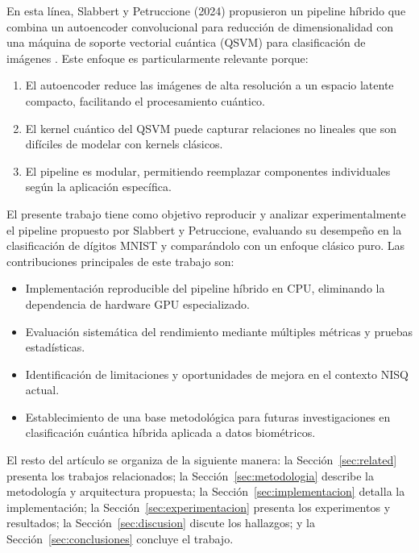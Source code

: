 \documentclass[conference]{IEEEtran}
\begin{document}
En esta línea, Slabbert y Petruccione (2024) propusieron un pipeline híbrido que 
combina un autoencoder convolucional para reducción de dimensionalidad con una 
máquina de soporte vectorial cuántica (QSVM) para clasificación de imágenes 
\cite{slabbert2024hybrid}. Este enfoque es particularmente relevante porque:
\begin{enumerate}
    \item El autoencoder reduce las imágenes de alta resolución a un espacio 
          latente compacto, facilitando el procesamiento cuántico.
    \item El kernel cuántico del QSVM puede capturar relaciones no lineales que 
          son difíciles de modelar con kernels clásicos.
    \item El pipeline es modular, permitiendo reemplazar componentes individuales 
          según la aplicación específica.
\end{enumerate}

El presente trabajo tiene como objetivo reproducir y analizar experimentalmente 
el pipeline propuesto por Slabbert y Petruccione, evaluando su desempeño en la 
clasificación de dígitos MNIST y comparándolo con un enfoque clásico puro. Las 
contribuciones principales de este trabajo son:
\begin{itemize}
    \item Implementación reproducible del pipeline híbrido en CPU, eliminando la 
          dependencia de hardware GPU especializado.
    \item Evaluación sistemática del rendimiento mediante múltiples métricas y 
          pruebas estadísticas.
    \item Identificación de limitaciones y oportunidades de mejora en el contexto 
          NISQ actual.
    \item Establecimiento de una base metodológica para futuras investigaciones 
          en clasificación cuántica híbrida aplicada a datos biométricos.
\end{itemize}

El resto del artículo se organiza de la siguiente manera: la Sección~\ref{sec:related} 
presenta los trabajos relacionados; la Sección~\ref{sec:metodologia} describe la 
metodología y arquitectura propuesta; la Sección~\ref{sec:implementacion} detalla 
la implementación; la Sección~\ref{sec:experimentacion} presenta los experimentos 
y resultados; la Sección~\ref{sec:discusion} discute los hallazgos; y la 
Sección~\ref{sec:conclusiones} concluye el trabajo.
\end{document}
